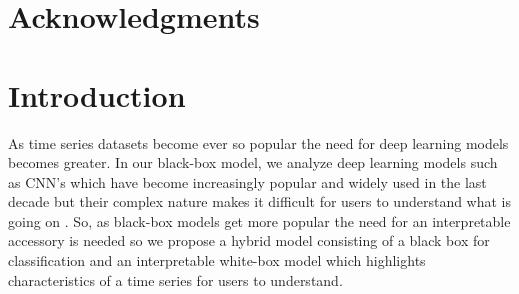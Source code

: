 \documentclass{turabian-thesis}
\begin{document}


\chapter{Acknowledgments}

\tableofcontents
\listofillustrations

\mainmatter
\chapter{Introduction}
\label{chap:introduction}

As time series datasets become ever so popular the need for deep learning models becomes greater.
In our black-box model, we analyze deep learning models such as CNN’s which have become increasingly popular and widely used in the last decade but their complex nature makes it difficult for users to understand what is going on \cite{wang_hybrid_2019}. So, as black-box models get more popular the need for an interpretable accessory is needed so we propose a hybrid model consisting of a black box for classification and an interpretable white-box model which highlights characteristics of a time series for users to understand.




\end{document}
